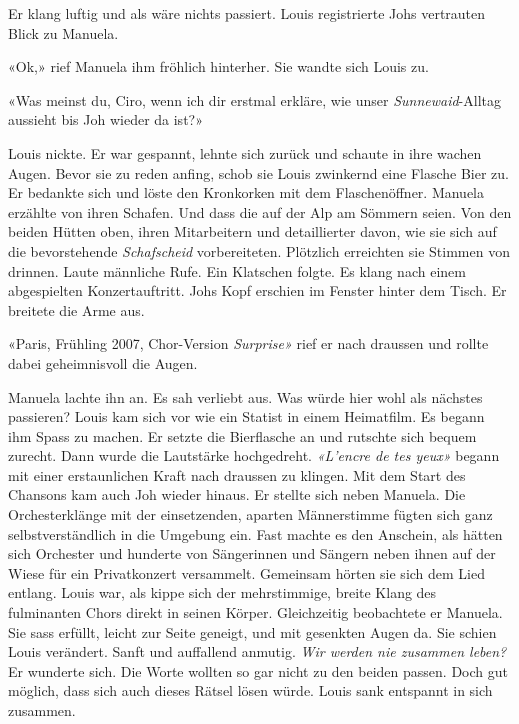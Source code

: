 Er klang luftig und als wäre nichts passiert. Louis registrierte Johs
vertrauten Blick zu Manuela.

«Ok,» rief Manuela ihm fröhlich hinterher. Sie wandte sich Louis zu.

«Was meinst du, Ciro, wenn ich dir erstmal erkläre, wie unser
\emph{Sunnewaid}-Alltag aussieht bis Joh wieder da ist?»

Louis nickte. Er war gespannt, lehnte sich zurück 
und schaute in ihre wachen Augen. Bevor sie zu reden anfing, schob sie
Louis zwinkernd eine Flasche Bier zu. Er bedankte sich und löste den
Kronkorken mit dem Flaschenöffner.
Manuela erzählte von ihren Schafen. Und dass die auf der Alp am Sömmern
seien. Von den beiden Hütten oben, ihren Mitarbeitern und detaillierter
davon, wie sie sich auf die bevorstehende \emph{Schafscheid}
vorbereiteten. Plötzlich erreichten sie Stimmen von drinnen.
Laute männliche Rufe. Ein Klatschen folgte. Es klang nach einem abgespielten Konzertauftritt.
Johs Kopf erschien im Fenster hinter dem Tisch. Er breitete die Arme aus. 

«Paris, Frühling 2007, Chor-Version \emph{Surprise»} rief er nach draussen und rollte dabei geheimnisvoll die Augen. 

Manuela lachte ihn an. Es sah verliebt aus. Was würde hier wohl
als nächstes passieren? Louis kam sich vor wie ein Statist in einem Heimatfilm. Es begann ihm Spass zu machen. Er setzte die
Bierflasche an und rutschte sich bequem zurecht. Dann wurde die
Lautstärke hochgedreht. \emph{«L’encre de tes yeux»} begann mit einer
erstaunlichen Kraft nach draussen zu klingen. Mit dem Start des Chansons 
kam auch Joh wieder hinaus. Er stellte sich neben Manuela. Die
Orchesterklänge mit der einsetzenden, aparten Männerstimme fügten sich
ganz selbstverständlich in die Umgebung ein. Fast machte es den
Anschein, als hätten sich Orchester und hunderte von Sängerinnen und
Sängern neben ihnen auf der Wiese für ein Privatkonzert versammelt. 
Gemeinsam hörten sie sich dem Lied entlang. Louis war, als kippe sich
der mehrstimmige, breite Klang des fulminanten Chors direkt in seinen
Körper. Gleichzeitig beobachtete er
Manuela. Sie sass erfüllt, leicht zur Seite geneigt, und mit gesenkten
Augen da. Sie schien Louis verändert. Sanft und auffallend anmutig. 
\emph{Wir werden nie zusammen leben?} Er wunderte sich. Die Worte wollten so gar nicht zu den beiden passen.
Doch gut möglich, dass sich auch dieses Rätsel lösen würde. Louis sank
entspannt in sich zusammen.


